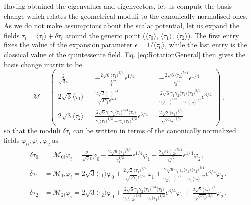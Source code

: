\documentclass[11pt,a4paper]{article}
\begin{document}
Having obtained the eigenvalues and eigenvectors, let us compute the basis change which relates the geometrical moduli to the canonically normalised ones. As we do not make assumptions about the scalar potential, let us expand the fields $\tau_i = \langle \tau_i \rangle + \delta \tau_i$ around the generic point ($\langle \tau_0\rangle$, $\langle \tau_1 \rangle$, $\langle \tau_2 \rangle$). The first entry fixes the value of the expansion parameter $\epsilon = 1/ \langle \tau_0 \rangle$, while the last entry is the classical value of the quintessence field. 
Eq. \eqref{eq:RotationGeneral} then gives the basis change matrix to be 
\begin{equation}
\mathcal{M} = \begin{pmatrix}
\frac{2}{\sqrt{3} \epsilon} && - \frac{2 \sqrt{6} \langle \tau_1 \rangle^{5/4}}{\gamma_1^{1/2}} \epsilon^{1/4} && - \frac{2 \sqrt{6} \langle \tau_2 \rangle^{5/4}}{\gamma_2^{1/2}} \epsilon^{1/4} \\
2 \sqrt{3} \langle \tau_1 \rangle && \frac{2 \sqrt{2} \langle \tau_1 \rangle^{1/4}}{\sqrt{3 \gamma_1} \epsilon^{3/4}} && \frac{2 \sqrt{6} \gamma_1 \gamma_2 \langle \tau_1 \rangle \langle \tau_2 \rangle^{5/4}}{\gamma_2 \langle \tau_1 \rangle^{1/2} - \gamma_1 \langle \tau_2 \rangle^{1/2}} \epsilon^{3/4} \\
2 \sqrt{3} \langle \tau_2 \rangle && \frac{2 \sqrt{6} \gamma_1 \gamma_2 \langle \tau_1 \rangle^{5/4} \langle \tau_2 \rangle}{\gamma_1 \langle \tau_2 \rangle^{1/2} - \gamma_2 \langle \tau_1 \rangle^{1/2}} \epsilon^{3/4} && \frac{2 \sqrt{2} \langle \tau_2 \rangle^{1/4}}{\sqrt{3 \gamma_2} \epsilon^{3/4}}
\end{pmatrix} \,,
\end{equation}
so that the moduli $\delta\tau_i$ can be written in terms of the canonically normalized fields $\varphi_0, \varphi_1, \varphi_2$ as
\begin{align}
\label{eq:BigfieldRotated}
\delta\tau_0 &= \mathcal{M}_{0i} \varphi_i = \frac{2}{\sqrt{3} \epsilon} \varphi_0 - \frac{2 \sqrt{6} \langle \tau_1 \rangle^{5/4}}{\gamma_1^{1/2}} \epsilon^{1/4} \varphi_1 - \frac{2 \sqrt{6} \langle \tau_2 \rangle^{5/4}}{\gamma_2^{1/2}} \epsilon^{1/4}  \varphi_2 \,, \\
\label{eq:SMfieldRotatedx}
\delta\tau_1 &= \mathcal{M}_{1i} \varphi_i = 2 \sqrt{3} \langle \tau_1 \rangle \varphi_0 + \frac{2 \sqrt{2} \langle \tau_1 \rangle^{1/4}}{\sqrt{3 \gamma_1} \epsilon^{3/4}} \varphi_1 + \frac{2 \sqrt{6} \gamma_1 \gamma_2 \langle \tau_1 \rangle \langle \tau_2 \rangle^{5/4}}{\gamma_2 \langle \tau_1 \rangle^{1/2} - \gamma_1 \langle \tau_2 \rangle^{1/2}} \epsilon^{3/4} \varphi_2 \,, \\
\label{eq:QfieldRotatedx}
\delta\tau_2 &= \mathcal{M}_{2i} \varphi_i = 2 \sqrt{3} \langle \tau_2 \rangle \varphi_0 + \frac{2 \sqrt{6} \gamma_1 \gamma_2 \langle \tau_1 \rangle^{5/4} \langle \tau_2 \rangle}{\gamma_1 \langle \tau_2 \rangle^{1/2} - \gamma_2 \langle \tau_1 \rangle^{1/2}} \epsilon^{3/4} \varphi_1 + \frac{2 \sqrt{2} \langle \tau_2 \rangle^{1/4}}{\sqrt{3 \gamma_2} \epsilon^{3/4}} \varphi_2 \,.
\end{align}
\end{document}
